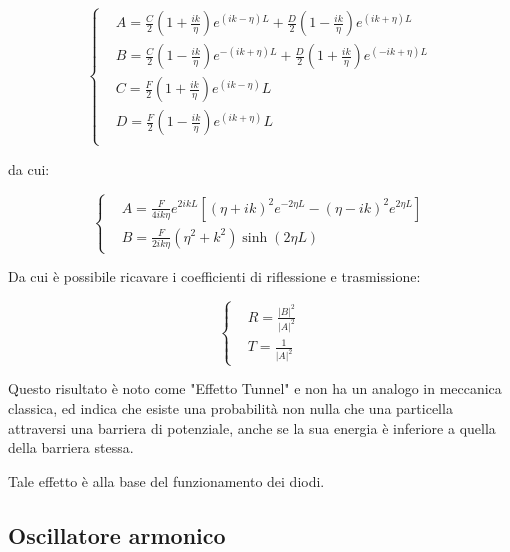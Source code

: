 \documentclass{article}
\begin{document}
\begin{equation}
    \left\{
    \begin{aligned}
         & A= \frac{C}{2}\left(1+\frac{ik}{\eta}\right)e^{(ik-\eta)L}+ \frac{D}{2}\left(1-\frac{ik}{\eta}\right)e^{(ik+\eta)L}   \\
         & B= \frac{C}{2}\left(1-\frac{ik}{\eta}\right)e^{-(ik+\eta)L}+ \frac{D}{2}\left(1+\frac{ik}{\eta}\right)e^{(-ik+\eta)L} \\
         & C=\frac{F}{2}\left(1+\frac{ik}{\eta}\right)e^(ik-\eta)L                                                               \\
         & D=\frac{F}{2}\left(1-\frac{ik}{\eta}\right)e^(ik+\eta)L                                                               \\
    \end{aligned}
    \right.
\end{equation}

da cui:

\begin{equation}
    \left\{
    \begin{aligned}
         & A=\frac{F}{4ik\eta}e^{2ikL}\left[(\eta+ik)^2e^{-2\eta L}- (\eta-ik)^2e^{2\eta L}\right] \\
         & B= \frac{F}{2ik\eta}(\eta^2+k^2)\sinh(2\eta L)
    \end{aligned}
    \right.
\end{equation}

Da cui è possibile ricavare i coefficienti di riflessione e trasmissione:

\begin{equation}
    \left\{
    \begin{aligned}
         & R= \frac{|B|^2}{|A|^2} \\
         & T= \frac{1}{|A|^2}
    \end{aligned}
    \right.
\end{equation}

Questo risultato è noto come "Effetto Tunnel" e non ha un analogo in meccanica classica, ed indica che esiste una probabilità non nulla
che una particella attraversi una barriera di potenziale, anche se la sua energia è inferiore a quella della barriera stessa.

Tale effetto è alla base del funzionamento dei diodi.



\subsection{Oscillatore armonico}
\end{document}
